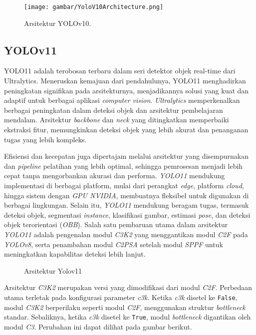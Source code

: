 \begin{figure}[H]
  \centering
  \texttt{[image: gambar/YoloV10Architecture.png]}
  \caption{Arsitektur YOLOv10.}
  \label{fig:ArsitekturYolov10}
\end{figure}

\subsection{YOLOv11}
\label{subsec:YOLOv11}

YOLO11 adalah terobosan terbaru dalam seri detektor objek real-time dari Ultralytics. Meneruskan kemajuan dari pendahulunya, YOLO11 menghadirkan peningkatan signifikan pada arsitekturnya, menjadikannya solusi yang kuat dan adaptif untuk berbagai aplikasi \emph{computer vision}. \emph{Ultralytics} memperkenalkan berbagai peningkatan dalam deteksi objek dan arsitektur pembelajaran mendalam. Arsitektur \emph{backbone} dan \emph{neck} yang ditingkatkan memperbaiki ekstraksi fitur, memungkinkan deteksi objek yang lebih akurat dan penanganan tugas yang lebih kompleks. 

Efisiensi dan kecepatan juga dipertajam melalui arsitektur yang disempurnakan dan \emph{pipeline} pelatihan yang lebih optimal, sehingga pemrosesan menjadi lebih cepat tanpa mengorbankan akurasi dan performa. \emph{YOLO11} mendukung implementasi di berbagai platform, mulai dari perangkat \emph{edge}, platform \emph{cloud}, hingga sistem dengan \emph{GPU NVIDIA}, membuatnya fleksibel untuk digunakan di berbagai lingkungan. Selain itu, \emph{YOLO11} mendukung beragam tugas, termasuk deteksi objek, segmentasi \emph{instance}, klasifikasi gambar, estimasi \emph{pose}, dan deteksi objek terorientasi (\emph{OBB}). Salah satu pembaruan utama dalam arsitektur \emph{YOLO11} adalah pengenalan modul \emph{C3K2} yang menggantikan modul \emph{C2F} pada \emph{YOLOv8}, serta penambahan modul \emph{C2PSA} setelah modul \emph{SPPF} untuk meningkatkan kapabilitas deteksi lebih lanjut.

\begin{figure}[H]
  \centering
  \resizebox{1\linewidth}{!}{
    
  }
  \caption{Arsitektur Yolov11}
  \label{fig:ArsitekturYolov11}
\end{figure}

Arsitektur \emph{C3K2} merupakan versi yang dimodifikasi dari modul \emph{C2F}. Perbedaan utama terletak pada konfigurasi parameter \emph{c3k}. Ketika \emph{c3k} disetel ke \texttt{False}, modul \emph{C3K2} berperilaku seperti modul \emph{C2F}, menggunakan struktur \emph{bottleneck} standar. Sebaliknya, ketika \emph{c3k} disetel ke \texttt{True}, modul \emph{bottleneck} digantikan oleh modul \emph{C3}. Perubahan ini dapat dilihat pada gambar berikut.

